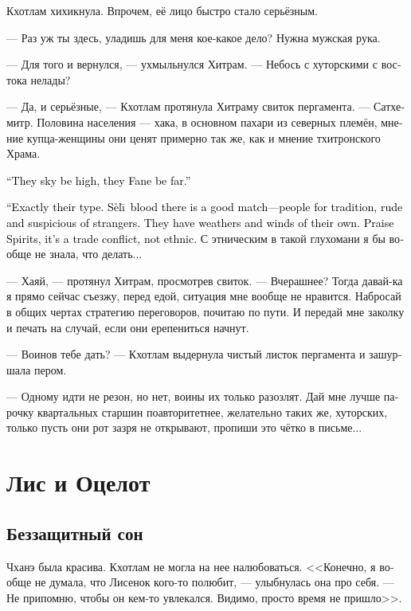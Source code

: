 \documentclass[a4paper,12pt,fleqn]{book}\usepackage{cooltooltips}\usepackage{polyglossia}\setdefaultlanguage[babelshorthands=true]{russian}\setotherlanguage{english}\defaultfontfeatures{Ligatures=TeX,Mapping=tex-text} \usepackage{xcolor}\definecolor{lightgray}{HTML}{bbbbbb}\color{lightgray}\newcommand{\ml}[3]{\textenglish{\textcolor{black}{#3}} }
\newcommand{\Seli}{S\r{e}l\={\i}}
\begin{document}
Кхотлам хихикнула.
Впрочем, её лицо быстро стало серьёзным.

--- Раз уж ты здесь, уладишь для меня кое-какое дело?
Нужна мужская рука.

--- Для того и вернулся, --- ухмыльнулся Хитрам.
--- Небось с хуторскими с востока нелады?

--- Да, и серьёзные, --- Кхотлам протянула Хитраму свиток пергамента.
--- Сатхемитр.
Половина населения --- хака, в основном пахари из северных племён, мнение купца-женщины они ценят примерно так же, как и мнение тхитронского Храма.

\ml{$0$}
{--- Небо высоко, Храм далеко.}
{``They sky be high, they Fane be far.''}

\ml{$0$}
{--- Вот именно такие.}
{``Exactly their type.}
\ml{$0$}
{Те, что сели, под стать --- ревнители старины, грубые и подозрительные к чужакам.}
{\Seli\ blood there is a good match---people for tradition, rude and suspicious of strangers.}
\ml{$0$}
{У них своя погода и свои ветра.}
{They have weathers and winds of their own.}
\ml{$0$}
{Слава духам, конфликт не этнический, а торговый.}
{Praise Spirits, it's a trade conflict, not ethnic.}
С этническим в такой глухомани я бы вообще не знала, что делать...

--- Хаяй, --- протянул Хитрам, просмотрев свиток.
--- Вчерашнее?
Тогда давай-ка я прямо сейчас съезжу, перед едой, ситуация мне вообще не нравится.
Набросай в общих чертах стратегию переговоров, почитаю по пути.
И передай мне заколку и печать на случай, если они ерепениться начнут.

--- Воинов тебе дать? --- Кхотлам выдернула чистый листок пергамента и зашуршала пером.

--- Одному идти не резон, но нет, воины их только разозлят.
Дай мне лучше парочку квартальных старшин поавторитетнее, желательно таких же, хуторских, только пусть они рот зазря не открывают, пропиши это чётко в письме...

\chapter{Лис и Оцелот}

\section{Беззащитный сон}

Чханэ была красива.
Кхотлам не могла на нее налюбоваться.
<<Конечно, я вообще не думала, что Лисенок кого-то полюбит, --- улыбнулась она про себя.
--- Не припомню, чтобы он кем-то увлекался.
Видимо, просто время не пришло>>.
\end{document}

